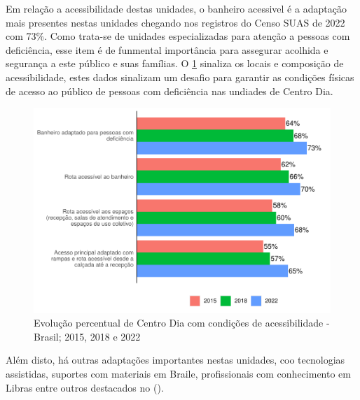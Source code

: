 \documentclass[
  brazilian]{report}
\begin{document}
Em relação a acessibilidade destas unidades, o banheiro acessivel é a
adaptação mais presentes nestas unidades chegando nos registros do Censo
SUAS de 2022 com 73\%. Como trata-se de unidades especializadas para
atenção a pessoas com deficiência, esse item é de funmental importância
para assegurar acolhida e segurança a este público e suas famílias. O
\cref{fig:cdia-acessibilidade} sinaliza os locais e composição de
acessibilidade, estes dados sinalizam um desafio para garantir as
condições físicas de acesso ao público de pessoas com deficiência nas
undiades de Centro Dia.

\begin{figure}
\includegraphics{Censo-SUAS-2022_files/figure-latex/cdia-acessibilidade-1} \caption[Evolução percentual de Centro Dia com condições de acessibilidade - Brasil]{Evolução percentual de Centro Dia com condições de acessibilidade - Brasil; 2015, 2018 e 2022}\label{fig:cdia-acessibilidade}
\end{figure}

Além disto, há outras adaptações importantes nestas unidades, coo
tecnologias assistidas, suportes com materiais em Braile, profissionais
com conhecimento em Libras entre outros destacados no
().
\end{document}
